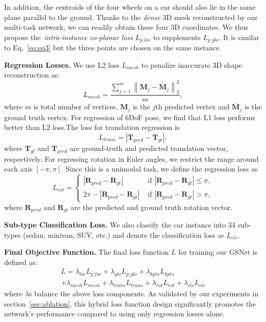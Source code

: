 \documentclass[runningheads]{llncs}
\newcommand{\bR}{\mathbf}
\begin{document}
In addition, the centroids of the four wheels on a car should also lie in the same plane parallel to the ground. Thanks to the \textit{dense} 3D mesh reconstructed by our multi-task network, we can readily obtain these four 3D coordinates. We thus propose the~\textit{intra-instance co-planar loss} $L_{p\_{loc}}$ to supplements $L_{p\_{glo}}$. It is similar to Eq.~\ref{eq:eq3} but the three points are chosen on the same instance. 

\smallskip\noindent\textbf{Regression Losses.}
We use L2 loss $L_{mesh}$ to penalize inaccurate 3D shape reconstruction as:
\begin{equation}
L_{mesh} = \frac{\sum_{j=1}^{m}{\left \| \bR{M}_j-\bR{\bar{M}}_{j} \right \|_2^2}}{m},
\end{equation}
where $m$ is total number of vertices, $\bR{M}_j$ is the $j$th predicted vertex and $\bR{\bar{M}}_{j}$ is the ground truth vertex. For regression of 6DoF pose, we find that L1 loss performs better than L2 loss.The loss for translation regression is
\begin{equation}
L_{trans} = \left| \bR{T}_{pred} - \bR{T}_{gt}\right|,
\end{equation}
where $\bR{T}_{gt}$ and $\bR{T}_{pred}$ are ground-truth and predicted translation vector, respectively. 
For regressing rotation in Euler angles, we restrict the range around each axis $[-\pi,\pi]$. Since this is a unimodal task, we define the regression loss as
\begin{equation}
L_{rot} = \begin{cases}
\left |\bR{R}_{pred} - \bR{R}_{gt}  \right | & \text{ if } \left |\bR{R}_{pred} - \bR{R}_{gt}  \right | \leq  \pi,\\ 
2\pi - \left |\bR{R}_{pred} - \bR{R}_{gt}  \right | & \text{ if } \left |\bR{R}_{pred} - \bR{R}_{gt}  \right | > \pi,
\end{cases}
\end{equation}
where $\bR{R}_{pred}$ and $\bR{R}_{gt}$ are the predicted and ground truth rotation vector.

\smallskip\noindent\textbf{Sub-type Classification Loss.}
We also classify the car instance into 34 sub-types (sedan, minivan, SUV, etc.) and denote the classification loss as $L_{cls}$.

\smallskip\noindent\textbf{Final Objective Function.}
The final loss function $L$ for training our GSNet is defined as:
\begin{equation}
\begin{array}{l}
L = \lambda_{loc}L_{p\_{loc}} + \lambda_{glo}L_{p\_{glo}} + \lambda_{kpts}L_{kpts} \\
+ \lambda_{mesh}L_{mesh} + \lambda_{trans}L_{trans} +  \lambda_{rot}L_{rot} + \lambda_{cls}L_{cls}
\end{array}
\label{eq:eq10}
\end{equation}
where $\lambda$s balance the above loss components. As validated by our experiments in section~\ref{sec:ablation}, this hybrid loss function design significantly promotes the network's performance compared to using only regression losses alone. 
\end{document}
